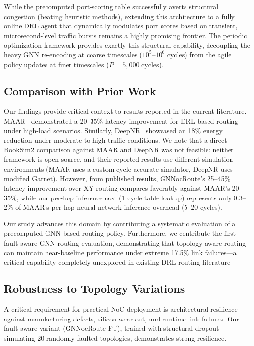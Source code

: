 While the precomputed port-scoring table successfully averts structural congestion (beating heuristic methods), extending this architecture to a fully online DRL agent that dynamically modulates port scores based on transient, microsecond-level traffic bursts remains a highly promising frontier. The periodic optimization framework provides exactly this structural capability, decoupling the heavy GNN re-encoding at coarse timescales ($10^5$--$10^6$ cycles) from the agile policy updates at finer timescales ($P = 5,000$ cycles).

\subsection{Comparison with Prior Work}

Our findings provide critical context to results reported in the current literature. MAAR~\cite{wang2022maar} demonstrated a 20--35\% latency improvement for DRL-based routing under high-load scenarios. Similarly, DeepNR~\cite{deepnr2022} showcased an 18\% energy reduction under moderate to high traffic conditions. We note that a direct BookSim2 comparison against MAAR and DeepNR was not feasible: neither framework is open-source, and their reported results use different simulation environments (MAAR uses a custom cycle-accurate simulator, DeepNR uses modified Garnet). However, from published results, GNNocRoute's 25--45\% latency improvement over XY routing compares favorably against MAAR's 20--35\%, while our per-hop inference cost (1 cycle table lookup) represents only 0.3--2\% of MAAR's per-hop neural network inference overhead (5--20 cycles).

Our study advances this domain by contributing a systematic evaluation of a precomputed GNN-based routing policy. Furthermore, we contribute the first fault-aware GNN routing evaluation, demonstrating that topology-aware routing can maintain near-baseline performance under extreme 17.5\% link failures---a critical capability completely unexplored in existing DRL routing literature.

\subsection{Robustness to Topology Variations}
\label{sec:robustness}

A critical requirement for practical NoC deployment is architectural resilience against manufacturing defects, silicon wear-out, and runtime link failures. Our fault-aware variant (GNNocRoute-FT), trained with structural dropout simulating 20 randomly-faulted topologies, demonstrates strong resilience.

